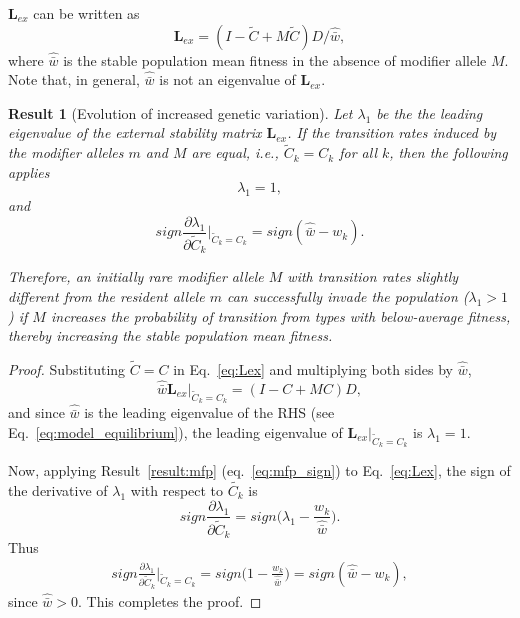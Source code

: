 \documentclass[9pt, a4paper, twocolumn]{extarticle}
\newtheorem{result}{Result}
\newcommand{\cl}{\mathbf{L}}
\begin{document}
$\cl_{ex}$ can be written as
\begin{equation}\label{eq:Lex}
\cl_{ex} = (I - \tilde{C} + M \tilde{C}) D /\hat{\bar w},
\end{equation}
where $\hat{\bar w}$ is the stable population mean fitness in the absence of modifier allele $M$.
Note that, in general, $\hat{\bar w}$ is not an eigenvalue of $\cl_{ex}$.
\medskip

\begin{result}[Evolution of increased genetic variation]
Let $\lambda_1$ be the the leading eigenvalue of the external stability matrix $\cl_{ex}$.
If the transition rates induced by the modifier alleles $m$ and $M$ are equal, i.e., $\tilde{C}_k=C_k$ for all $k$, then the following applies
\begin{equation}
\lambda_1=1,
\end{equation}
and
\begin{equation}
sign \frac{\partial \lambda_1}{\partial \tilde{C}_k}\bigg\rvert_{\tilde{C}_k = C_k} = 
sign(\hat{\bar w} - w_k).
\end{equation}

Therefore, an initially rare modifier allele $M$ with transition rates slightly different from the resident allele $m$ can successfully invade the population ($\lambda_1>1$) if $M$ increases the probability of transition from types with below-average fitness, thereby increasing the stable population mean fitness.
\end{result}

\begin{proof}
Substituting $\tilde{C}=C$ in Eq.~\ref{eq:Lex} and multiplying both sides by $\hat{\bar w}$,
\begin{equation}
\hat{\bar w} \cl_{ex}\big\rvert_{\tilde{C}_k = C_k} = (I-C+MC) D,
\end{equation}
and since $\hat{\bar w}$ is the leading eigenvalue of the RHS (see Eq.~\ref{eq:model_equilibrium}),
the leading eigenvalue of $\cl_{ex}\big\rvert_{\tilde{C}_k = C_k}$ is $\lambda_1=1$.

Now, applying Result~\ref{result:mfp} (eq.~\ref{eq:mfp_sign}) to Eq.~\ref{eq:Lex}, the sign of the derivative of $\lambda_1$ with respect to $\tilde{C_k}$ is
\begin{equation}
sign \frac{\partial \lambda_1}{\partial \tilde{C}_k} =
sign\Big(\lambda_1 - \frac{w_k}{\hat{\bar w}}\Big).
\end{equation}
Thus
\begin{multline}
sign \frac{\partial \lambda_1}{\partial \tilde{C}_k}\bigg\rvert_{\tilde{C}_k = C_k} = 
sign\Big(1 - \frac{w_k}{\hat{\bar w}}\Big) =  
sign(\hat{\bar w} - w_k),
\end{multline}
since $\hat{\bar w}>0$.
This completes the proof.
\end{proof}
\end{document}
